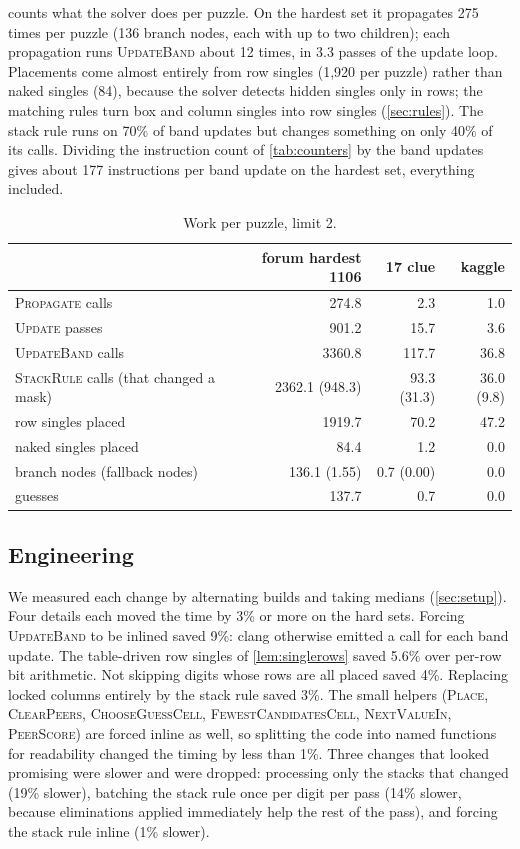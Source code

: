 \documentclass[11pt]{article}
\theoremstyle{definition}
\theoremstyle{plain}
\let\origtextsc\textsc
\renewcommand{\textsc}[1]{\textup{\origtextsc{#1}}}
\begin{document}
 counts what the solver does per puzzle. On the hardest set it propagates 275 times per puzzle (136
branch nodes, each with up to two children); each propagation runs \textsc{UpdateBand} about 12 times, in 3.3 passes of the update
loop. Placements come almost entirely from row singles (1{,}920 per puzzle) rather than naked
singles (84), because the solver detects hidden singles only in rows; the matching rules turn box and column
singles into row singles (\cref{sec:rules}). The stack rule runs on 70\% of band
updates but changes something on only 40\% of its calls. Dividing the instruction count of \cref{tab:counters} by the
band updates gives about 177 instructions per band update on the hardest set, everything included.

\begin{table}[t]
\centering
\caption{Work per puzzle, limit 2.}
\label{tab:work}
\small
\begin{tabular}{lrrr}
\toprule
& forum hardest 1106 & 17 clue & kaggle \\
\midrule
\textsc{Propagate} calls & 274.8 & 2.3 & 1.0 \\
\textsc{Update} passes & 901.2 & 15.7 & 3.6 \\
\textsc{UpdateBand} calls & 3360.8 & 117.7 & 36.8 \\
\textsc{StackRule} calls (that changed a mask) & 2362.1 (948.3) & 93.3 (31.3) & 36.0 (9.8) \\
row singles placed & 1919.7 & 70.2 & 47.2 \\
naked singles placed & 84.4 & 1.2 & 0.0 \\
branch nodes (fallback nodes) & 136.1 (1.55) & 0.7 (0.00) & 0.0 \\
guesses & 137.7 & 0.7 & 0.0 \\
\bottomrule
\end{tabular}
\end{table}

\subsection{Engineering}

We measured each change by alternating builds and taking medians (\cref{sec:setup}). Four details each moved the time
by 3\% or more on the hard sets. Forcing \textsc{UpdateBand} to be inlined saved 9\%: clang otherwise emitted a call
for each band update. The table-driven row singles of \cref{lem:singlerows} saved 5.6\% over per-row bit arithmetic.
Not skipping digits whose rows are all placed saved 4\%. Replacing locked columns entirely by the stack rule saved 3\%.
The small helpers (\textsc{Place}, \textsc{ClearPeers}, \textsc{ChooseGuessCell}, \textsc{FewestCandidatesCell},
\textsc{NextValueIn}, \textsc{PeerScore}) are forced inline as well, so splitting the code into named functions for
readability changed the timing by less than 1\%.
Three changes that looked promising were slower and were dropped: processing only the stacks that changed (19\%
slower), batching the stack rule once per digit per pass (14\% slower, because eliminations applied immediately help
the rest of the pass), and forcing the stack rule inline (1\% slower).
\end{document}
